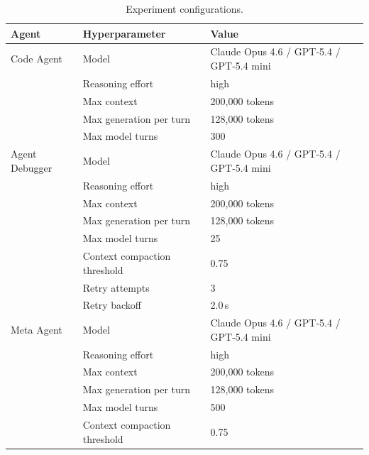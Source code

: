 \documentclass{article}
\begin{document}
\begin{table}[h!]
    \centering
    \small
    \setlength{\tabcolsep}{6pt}
    \renewcommand{\arraystretch}{1.05}
    \begin{tabular}{lll}
        \toprule
        \textbf{Agent} & \textbf{Hyperparameter} & \textbf{Value} \\
        \midrule
        Code Agent
            & Model              & Claude Opus 4.6 / GPT-5.4 / GPT-5.4 mini \\
            & Reasoning effort           & high \\
            & Max context                & 200{,}000 tokens \\
            & Max generation per turn    & 128{,}000 tokens \\
            & Max model turns            & 300 \\
        \midrule
        Agent Debugger
            & Model              & Claude Opus 4.6 / GPT-5.4 / GPT-5.4 mini \\
            & Reasoning effort           & high \\
            & Max context                & 200{,}000 tokens \\
            & Max generation per turn    & 128{,}000 tokens \\
            & Max model turns            & 25 \\
            & Context compaction threshold & 0.75 \\ 
            & Retry attempts             & 3 \\
            & Retry backoff              & 2.0\,s \\
        \midrule
        Meta Agent
            & Model              & Claude Opus 4.6 / GPT-5.4 / GPT-5.4 mini \\
            & Reasoning effort           & high \\
            & Max context                & 200{,}000 tokens \\
            & Max generation per turn    & 128{,}000 tokens \\
            & Max model turns            & 500 \\
            & Context compaction threshold & 0.75 \\ 
        \bottomrule
    \end{tabular}
    \vspace{2mm}
    \caption{Experiment configurations.}
    \label{tab:hparams}
\end{table}
\end{document}
